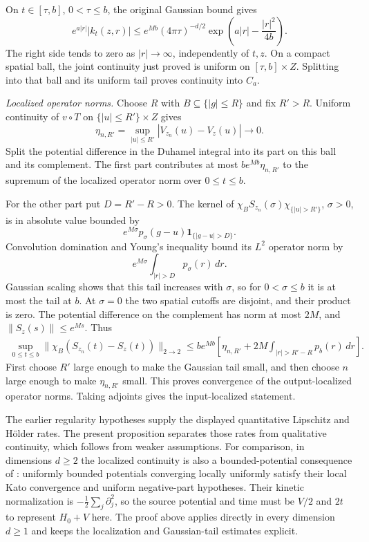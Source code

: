 On $t\in[\tau,b]$, $0<\tau\leq b$, the original Gaussian bound gives
\[
e^{a|r|}|k_t(z,r)|
\leq e^{Mb}(4\pi\tau)^{-d/2}
             \exp\left(a|r|-\frac{|r|^2}{4b}\right).
\]
The right side tends to zero as $|r|\to\infty$, independently of
$t,z$. On a compact spatial ball, the joint continuity just proved
is uniform on $[\tau,b]\times Z$. Splitting into that ball and its
uniform tail proves continuity into $C_a$.

\emph{Localized operator norms.}
Choose $R$ with $B\subseteq\{|g|\leq R\}$ and fix $R'>R$.
Uniform continuity of $v\circ T$ on
$\{|u|\leq R'\}\times Z$ gives
\[
\eta_{n,R'}=\sup_{|u|\leq R'}|V_{z_n}(u)-V_z(u)|\longrightarrow0.
\]
Split the potential difference in the Duhamel integral into its part
on this ball and its complement. The first part contributes at most
$b e^{Mb}\eta_{n,R'}$ to the supremum of the localized operator
norm over $0\leq t\leq b$.

For the other part put $D=R'-R>0$. The kernel of
$\chi_B S_{z_n}(\sigma)\chi_{\{|u|>R'\}}$, $\sigma>0$,
is in absolute value bounded by
\[
e^{M\sigma}p_\sigma(g-u)\mathbf1_{\{|g-u|>D\}}.
\]
Convolution domination and Young's inequality bound its $L^2$
operator norm by
\[
e^{M\sigma}\int_{|r|>D}p_\sigma(r)\,dr.
\]
Gaussian scaling shows that this tail increases with $\sigma$,
so for $0<\sigma\leq b$ it is at most the tail at $b$.
At $\sigma=0$ the two spatial cutoffs are disjoint, and their
product is zero. The potential difference on the complement has
norm at most $2M$, and $\|S_z(s)\|\leq e^{Ms}$. Thus
\[
\begin{split}
\sup_{0\leq t\leq b}
 \|\chi_B(S_{z_n}(t)-S_z(t))\|_{2\to2}
\leq b e^{Mb}\left[\eta_{n,R'}+
                 2M\int_{|r|>R'-R}p_b(r)\,dr\right].
\end{split}
\]
First choose $R'$ large enough to make the Gaussian tail small,
and then choose $n$ large enough to make $\eta_{n,R'}$ small.
This proves convergence of the output-localized operator norms.
Taking adjoints gives the input-localized statement.
\Done

The earlier regularity hypotheses supply the displayed quantitative
Lipschitz and H\"older rates. The present proposition separates those
rates from qualitative continuity, which follows from weaker assumptions.
For comparison, in dimensions $d\geq2$ the localized continuity is also
a bounded-potential consequence of
\textcite[Theorem~5.1]{BroderixHundertmarkLeschke2000}: uniformly bounded
potentials converging locally uniformly satisfy their local Kato
convergence and uniform negative-part hypotheses. Their kinetic
normalization is $-\tfrac12\sum_j\partial_j^2$, so the source potential
and time must be $V/2$ and $2t$ to represent $H_0+V$ here.
The proof above applies directly in every dimension $d\geq1$ and keeps
the localization and Gaussian-tail estimates explicit.

